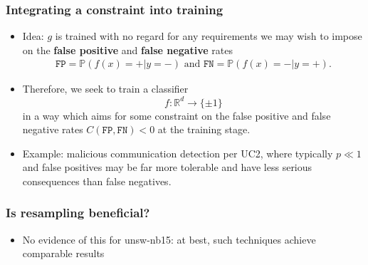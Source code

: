 \documentclass{beamer}
\begin{document}
\begin{frame}
\frametitle{Integrating a constraint into training}
\begin{itemize}
\item
Idea: $g$ is trained with no regard for any requirements we may wish to impose on the \textbf{false positive} and \textbf{false negative} rates
\begin{align*}
\texttt{FP}=\mathbb P(f(x)=+|y=-)\text{ and }\texttt{FN}=\mathbb P(f(x)=-|y=+).
\end{align*}
\item
Therefore, we seek to train a classifier
$$
f:\mathbb R^d\rightarrow \{\pm 1\}
$$
in a way which aims for some constraint on the false positive and false negative rates $C(\texttt{FP},\texttt{FN})<0$ at the training stage.
\item
Example: malicious communication detection per UC2, where typically $p\ll 1$ and false positives may be far more tolerable and have less serious consequences than false negatives.
\end{itemize}
\end{frame}
\begin{frame}
\frametitle{Is resampling beneficial?}
\begin{itemize}
\item
No evidence of this for unsw-nb15: at best, such techniques achieve comparable results
\end{itemize}
\end{frame}
\end{document}
